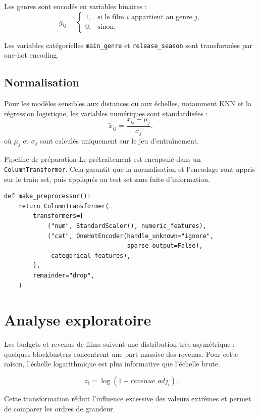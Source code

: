 \documentclass[11pt,a4paper]{article}
\begin{document}
Les genres sont encodés en variables binaires :
\[
g_{ij} =
\begin{cases}
1, & \text{si le film } i \text{ appartient au genre } j,\\
0, & \text{sinon.}
\end{cases}
\]

Les variables catégorielles \texttt{main\_genre} et \texttt{release\_season} sont transformées par one-hot encoding.

\subsection{Normalisation}

Pour les modèles sensibles aux distances ou aux échelles, notamment KNN et la régression logistique, les variables numériques sont standardisées :
\[
\tilde{x}_{ij} = \frac{x_{ij} - \mu_j}{\sigma_j},
\]
où $\mu_j$ et $\sigma_j$ sont calculés uniquement sur le jeu d'entraînement.

\begin{methodbox}{Pipeline de préparation}
Le prétraitement est encapsulé dans un \texttt{ColumnTransformer}. Cela garantit que la normalisation et l'encodage sont appris sur le train set, puis appliqués au test set sans fuite d'information.
\end{methodbox}

\begin{lstlisting}[caption={Préprocesseur commun aux modèles.}]
def make_preprocessor():
    return ColumnTransformer(
        transformers=[
            ("num", StandardScaler(), numeric_features),
            ("cat", OneHotEncoder(handle_unknown="ignore",
                                  sparse_output=False),
             categorical_features),
        ],
        remainder="drop",
    )
\end{lstlisting}

\section{Analyse exploratoire}

Les budgets et revenus de films suivent une distribution très asymétrique : quelques blockbusters concentrent une part massive des revenus. Pour cette raison, l'échelle logarithmique est plus informative que l'échelle brute.

\[
z_i = \log(1 + revenue\_adj_i).
\]

Cette transformation réduit l'influence excessive des valeurs extrêmes et permet de comparer les ordres de grandeur.
\end{document}

